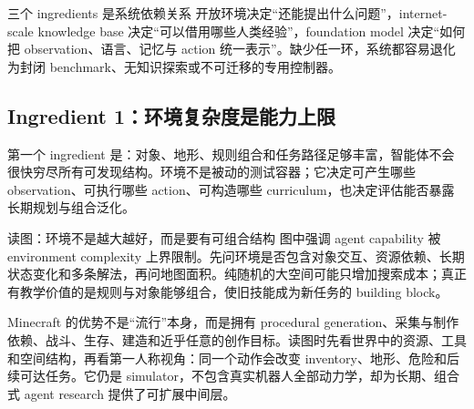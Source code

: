 \begin{importantbox}{三个 ingredients 是系统依赖关系}
开放环境决定“还能提出什么问题”，internet-scale knowledge base 决定“可以借用哪些人类经验”，foundation model 决定“如何把 observation、语言、记忆与 action 统一表示”。缺少任一环，系统都容易退化为封闭 benchmark、无知识探索或不可迁移的专用控制器。
\end{importantbox}


\subsection{Ingredient 1：环境复杂度是能力上限}

第一个 ingredient 是：对象、地形、规则组合和任务路径足够丰富，智能体不会很快穷尽所有可发现结构。环境不是被动的测试容器；它决定可产生哪些 observation、可执行哪些 action、可构造哪些 curriculum，也决定评估能否暴露长期规划与组合泛化。


\begin{knowledgebox}{读图：环境不是越大越好，而是要有可组合结构}
图中强调 agent capability 被 environment complexity 上界限制。先问环境是否包含对象交互、资源依赖、长期状态变化和多条解法，再问地图面积。纯随机的大空间可能只增加搜索成本；真正有教学价值的是规则与对象能够组合，使旧技能成为新任务的 building block。
\end{knowledgebox}


Minecraft 的优势不是“流行”本身，而是拥有 procedural generation、采集与制作依赖、战斗、生存、建造和近乎任意的创作目标。读图时先看世界中的资源、工具和空间结构，再看第一人称视角：同一个动作会改变 inventory、地形、危险和后续可达任务。它仍是 simulator，不包含真实机器人全部动力学，却为长期、组合式 agent research 提供了可扩展中间层。


